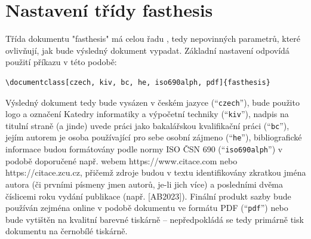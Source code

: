 \documentclass[czech, ing, kiv, he, iso690alph]{fasthesis}
\begin{document}
\section{Nastavení třídy {\ttzfamily fasthesis}}
Třída dokumentu \filename"fasthesis" má celou řadu , tedy nepovinných parametrů, které ovlivňují, jak bude výsledný dokument vypadat. Základní nastavení odpovídá použití příkazu v této podobě:
\lstset{style=plainsrc}
\begin{lstlisting}
\documentclass[czech, kiv, bc, he, iso690alph, pdf]{fasthesis}
\end{lstlisting}
Výsledný dokument tedy bude vysázen v českém jazyce (``\verb"czech"''), bude použito logo a označení Katedry informatiky a výpočetní techniky (``\verb"kiv"''), nadpis na titulní straně (a jinde) uvede práci jako bakalářskou kvalifikační práci (``\verb"bc"''), jejím autorem je osoba používající pro sebe osobní zájmeno  (``\verb"he"''), bibliografické informace budou formátovány podle
normy ISO ČSN 690 (``\verb"iso690alph"'') v podobě doporučené např. webem {\ttzfamily\footnotesize https://www.citace.com} nebo {\ttzfamily\footnotesize https://citace.zcu.cz}, přičemž zdroje budou v textu identifikovány zkratkou jména autora (či prvními písmeny jmen autorů, je-li jich více) a posledními dvěma číslicemi roku vydání publikace (např. [AB2023]).
Finální produkt sazby bude používán zejména online v podobě dokumentu ve formátu PDF (``\verb"pdf"'') nebo bude vytištěn na kvalitní barevné tiskárně -- nepředpokládá se tedy primárně tisk dokumentu na černobílé tiskárně.
%
%
%
\end{document}
